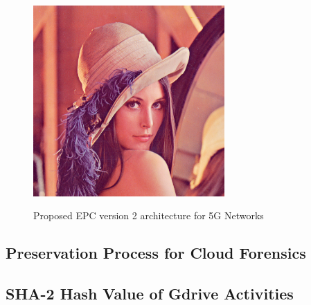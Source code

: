 \begin{appendices}
	\begin{figure}[h]
		\centering
		\includegraphics [width=0.65\textwidth]{pics/lena.png} \\
		\caption {Proposed EPC version 2 architecture for 5G Networks}
		\label{fig:epcc2}
	\end{figure}
	
	\begin{landscape}
		
		\chapter{Preservation Process for Cloud Forensics}
		\label{app:preservation}
		
		\section{SHA-2 Hash Value of Gdrive Activities}
		\label{app:hash1}
		
		\begin{table}[h]
			

\end{table}
\end{landscape}
\end{appendices}
